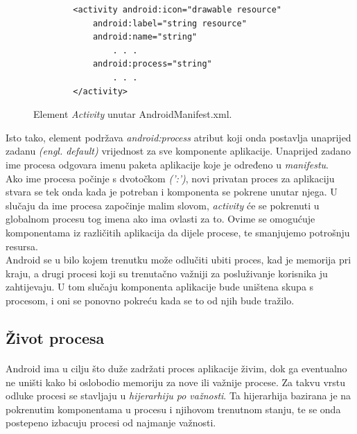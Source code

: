 \documentclass[times, utf8, zavrsni]{fer}
\begin{document}
\begin{figure}[ht!]
\centering
\begingroup
		\begin{lstlisting}
        <activity android:icon="drawable resource"
            android:label="string resource"
            android:name="string"
          	    . . .
            android:process="string"
          	    . . .
        </activity>
		\end{lstlisting}
\endgroup
\caption{Element \textit{Activity} unutar AndroidManifest.xml.}
\label{overflow}
\end{figure}

Isto tako, \verb|| element podržava \textit{android:process} atribut koji onda postavlja unaprijed zadanu \textit{(engl. default)} vrijednost za sve komponente aplikacije. Unaprijed zadano ime procesa odgovara imenu paketa aplikacije koje je određeno u \textit{manifestu}.\\

Ako ime procesa počinje s dvotočkom \textit{(':')}, novi privatan proces za aplikaciju stvara se tek onda kada je potreban i komponenta se pokrene unutar njega. U slučaju da ime procesa započinje malim slovom, \textit{activity} će se pokrenuti u globalnom procesu tog imena ako ima ovlasti za to. Ovime se omogućuje komponentama iz različitih aplikacija da dijele procese, te smanjujemo potrošnju resursa.\\

Android se u bilo kojem trenutku može odlučiti ubiti proces, kad je memorija pri kraju, a drugi procesi koji su trenutačno važniji za posluživanje korisnika ju zahtijevaju. U tom slučaju komponenta aplikacije bude uništena skupa s procesom, i oni se ponovno pokreću kada se to od njih bude tražilo.


\subsection{Život procesa}
\paragraph{}
Android ima u cilju što duže zadržati proces aplikacije živim, dok ga eventualno ne uništi kako bi oslobodio memoriju za nove ili važnije procese. Za takvu vrstu odluke procesi se stavljaju u \textit{hijerarhiju po važnosti}. Ta hijerarhija bazirana je na pokrenutim komponentama u procesu i njihovom trenutnom stanju, te se onda postepeno izbacuju procesi od najmanje važnosti.\\
\end{document}
